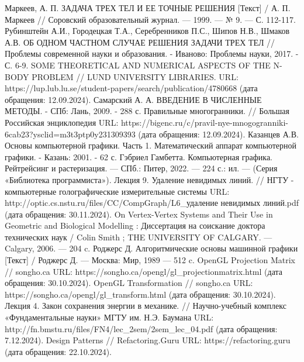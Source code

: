 \begin{thebibliography}{}
	 Маркеев, А. П. ЗАДАЧА ТРЕХ ТЕЛ И ЕЕ ТОЧНЫЕ РЕШЕНИЯ [Текст] / А. П. Маркеев // Соровский образовательный журнал. — 1999. — № 9. — С. 112-117.
	 Рубинштейн А.И., Городецкая Т.А., Серебренников П.С., Шипов Н.В., Шмаков А.В. ОБ ОДНОМ ЧАСТНОМ СЛУЧАЕ РЕШЕНИЯ ЗАДАЧИ ТРЕХ ТЕЛ // Проблемы современной науки и образования. - Иваново: Проблемы науки, 2017. - С. 6-9.
	 SOME THEORETICAL AND NUMERICAL ASPECTS OF THE N-BODY PROBLEM // LUND UNIVERSITY LIBRARIES. URL: https://lup.lub.lu.se/student-papers/search/publication/4780668 (дата обращения: 12.09.2024).
	 Самарский А. А. ВВЕДЕНИЕ В ЧИСЛЕННЫЕ МЕТОДЫ. - СПб: Лань, 2009. - 288 с.
	 Правильные многогранники. // Большая Российская энциклопедия URL: https://bigenc.ru/c/pravil-nye-mnogogranniki-6cab23?ysclid=m3t3ptp0y231309393 (дата обращения: 12.09.2024).
	 Казанцев А.В. Основы компьютерной графики. Часть 1. Математический аппарат компьютерной графики. - Казань: 2001. - 62 с.
	 Гэбриел Гамбетта. Компьютерная графика. Рейтрейсинг и растеризация. — СПб.: Питер, 2022. — 224 с.: ил. — (Серия «Библиотека программиста»).
	 Лекция 9. Удаление невидимых линий. // НГТУ - компьютерные голографические измерительные системы URL: http://optic.cs.nstu.ru/files/CC/CompGraph/L6\_удаление невидимых линий.pdf (дата обращения: 30.11.2024).
	 On Vertex-Vertex Systems and Their Use in Geometric and Biological Modelling : Диссертация на соискание доктора технических наук / Colin Smith ; THE UNIVERSITY OF CALGARY. — Calgary, 2006. — 204 c.
	 Роджерс Д. Алгоритмические основы машинной графики [Текст] / Роджерс Д. — Москва: Мир, 1989 — 512 c.
	 OpenGL Projection Matrix // songho.ca URL: https://songho.ca/opengl/gl\_projectionmatrix.html (дата обращения: 30.10.2024).
	 OpenGL Transformation // songho.ca URL: https://songho.ca/opengl/gl\_transform.html (дата обращения: 30.10.2024).
	 Лекция 4. Закон сохранения энергии в механике. // Научно-учебный комплекс «Фундаментальные науки» МГТУ им. Н.Э. Баумана URL: http://fn.bmstu.ru/files/FN4/lec\_2sem/2sem\_lec\_04.pdf (дата обращения: 7.12.2024).
	 Design Patterns // Refactoring.Guru URL: https://refactoring.guru (дата обращения: 22.10.2024).
\end{thebibliography}
